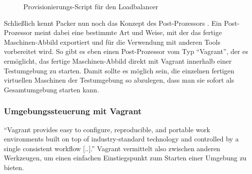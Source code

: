 \begin{figure}[!ht]
  \begin{center}
    \caption{Provisionierungs-Script für den Loadbalancer}
    \label{Loadbalancer-Install}
  \end{center}
\end{figure}

Schließlich kennt Packer nun noch das Konzept des Post-Prozessors \citep[Vgl.][]{Packer:003}. Ein Post-Prozessor meint dabei eine bestimmte Art und Weise, mit der das fertige Maschinen-Abbild exportiert und für die Verwendung mit anderen Tools vorbereitet wird. So gibt es eben einen Post-Prozessor vom Typ "`Vagrant"', der es ermöglicht, das fertige Maschinen-Abbild direkt mit Vagrant innerhalb einer Testumgebung zu starten. Damit sollte es möglich sein, die einzelnen fertigen virtuellen Maschinen der Testumgebung so abzulegen, dass man sie sofort als Gesamtumgebung starten kann.

\subsubsection{Umgebungssteuerung mit Vagrant}

"`Vagrant provides easy to configure, reproducible, and portable work environments built on top of industry-standard technology and controlled by a single consistent workflow [..]."' \citep[S.][]{Vagrant:001} Vagrant vermittelt also zwischen anderen Werkzeugen, um einen einfachen Einstiegspunkt zum Starten einer Umgebung zu bieten.

